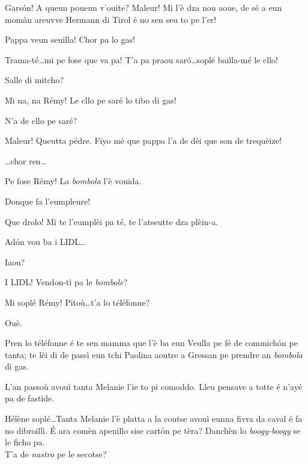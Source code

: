 \begin{drama}

\Cesarspeaks{} Gars\'on! A queun poueun v'ouite? Maleur! Mi l'è dza nou aoue, de sé a eun momàn areuvve Hermann di Tirol é no sen seu to pe l'er!

\Remyspeaks Pappa veun seuilla! Chor pa lo gas! 

\Cesarspeaks{} Trama-té\ldots mi pe fose que va pa! T'a pa praou sar\'o\ldots soplé bailla-mé le cllo!

\Remyspeaks Salle di mitcho?

\Cesarspeaks{} Mi na, na Rémy! Le cllo pe saré lo tibo di gas!

\Remyspeaks N'a de cllo pe saré?

\Cesarspeaks Maleur! Queutta pédre. Fiyo mé que pappa l'a de dèi que son de trequèize!


\Cesarspeaks \ldots chor ren\ldots


\Cesarspeaks  Pe fose Rémy! La \textit{bombola} l’è vouida. 

\Remyspeaks Donque fa l'eumpleure!

\Cesarspeaks{} Que drolo! Mi te l'eumplèi pa té, te l'atseutte dza plèin-a.

\Remyspeaks Ad\'on vou ba i LIDL\ldots

\Cesarspeaks Iaou?

\Remyspeaks I LIDL! Vendon-tì pa le \textit{bombole}?

\Cesarspeaks Mi soplé Rémy! Pitoù\ldots t'a lo téléfonne?

\Remyspeaks Ouè.

\Cesarspeaks Pren lo téléfonne é te sen mamma que l'è ba eun Veulla pe fé de commich\'on pe tanta; te lèi di de passì eun tchi Paolina aoutre a Gressan pe prendre an \textit{bombola} di gas.

\Helenespeaks L’an passoù avouì tanta Melanie l’ie to pi comoddo. Lleu pensave a totte é n'ayé pa de fastide.

\Cesarspeaks {} Hélène soplé\ldots Tanta Melanie l’è platta a la coutse avouì eunna fivra da caval é fa no dibroillì.  É ara comèn apeuillo sise cart\'on pe tèra? Danchèn lo \textit{boogy-boogy} se le ficho pa.\\  T’a de \textit{nastro} pe le secotse?


\end{drama}
